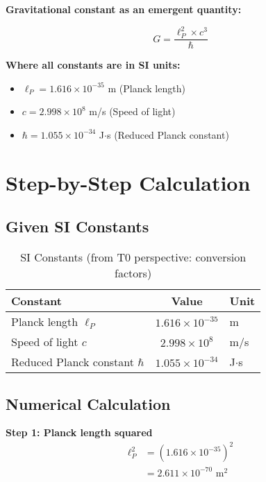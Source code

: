 \documentclass[12pt,a4paper]{article}
\theoremstyle{definition}
\begin{document}
	\begin{formula}
		\textbf{Gravitational constant as an emergent quantity:}
		
		\begin{equation}
			\boxed{G = \frac{\ell_P^2 \times c^3}{\hbar}}
		\end{equation}
		
		\textbf{Where all constants are in SI units:}
		\begin{itemize}
			\item $\ell_P = 1.616 \times 10^{-35}$ m (Planck length)
			\item $c = 2.998 \times 10^{8}$ m/s (Speed of light)
			\item $\hbar = 1.055 \times 10^{-34}$ J$\cdot$s (Reduced Planck constant)
		\end{itemize}
	\end{formula}
	
	\section{Step-by-Step Calculation}
	
	\subsection{Given SI Constants}
	
	\begin{table}[h]
		\centering
		\begin{tabular}{lcl}
			\toprule
			\textbf{Constant} & \textbf{Value} & \textbf{Unit} \\
			\midrule
			Planck length $\ell_P$ & $1.616 \times 10^{-35}$ & m \\
			Speed of light $c$ & $2.998 \times 10^{8}$ & m/s \\
			Reduced Planck constant $\hbar$ & $1.055 \times 10^{-34}$ & J$\cdot$s \\
			\bottomrule
		\end{tabular}
		\caption{SI Constants (from T0 perspective: conversion factors)}
	\end{table}
	
	\subsection{Numerical Calculation}
	
	\textbf{Step 1: Planck length squared}
	\begin{align}
		\ell_P^2 &= (1.616 \times 10^{-35})^2 \\
		&= 2.611 \times 10^{-70} \text{ m}^2
	\end{align}
	
\end{document}
